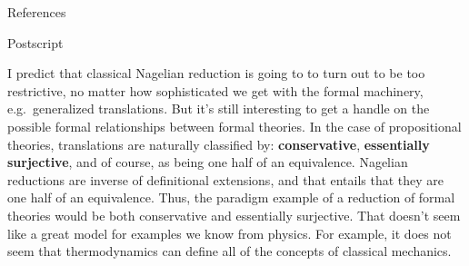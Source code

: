 \documentclass[fleqn]{beamer}
\begin{document}
\begin{frame}[allowframebreaks]{References}

\printbibliography[heading=none]

\end{frame}

\begin{frame}{Postscript}

  \small I predict that classical Nagelian reduction is going to to
  turn out to be too restrictive, no matter how sophisticated we get
  with the formal machinery, e.g.\ generalized translations. But it's
  still interesting to get a handle on the possible formal
  relationships between formal theories. In the case of propositional
  theories, translations are naturally classified by:
  \textbf{conservative}, \textbf{essentially surjective}, and of
  course, as being one half of an equivalence. Nagelian reductions are
  inverse of definitional extensions, and that entails that they are
  one half of an equivalence. Thus, the paradigm example of a
  reduction of formal theories would be both conservative and
  essentially surjective. That doesn't seem like a great model for
  examples we know from physics. For example, it does not seem that
  thermodynamics can define all of the concepts of classical
  mechanics.



\end{frame}


\end{document}
